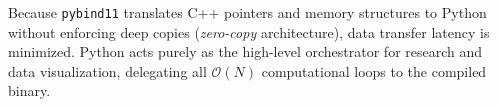 Because \texttt{pybind11} translates C++ pointers and memory structures to Python without enforcing deep copies (\textit{zero-copy} architecture), data transfer latency is minimized. Python acts purely as the high-level orchestrator for research and data visualization, delegating all $\mathcal{O}(N)$ computational loops to the compiled binary.

